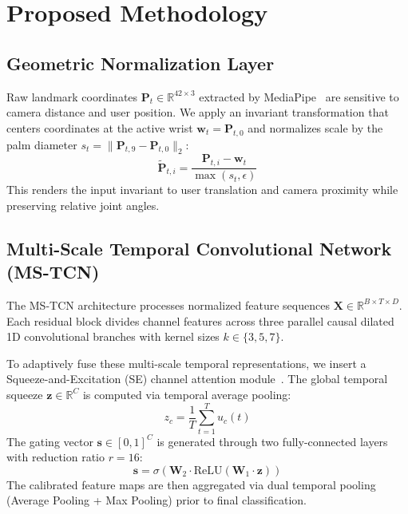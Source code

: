 \documentclass[journal,compsoc]{IEEEtran}
\begin{document}
\section{Proposed Methodology}

\subsection{Geometric Normalization Layer}
Raw landmark coordinates $\mathbf{P}_t \in \mathbb{R}^{42 \times 3}$ extracted by MediaPipe~\cite{lugaresi2019mediapipe} are sensitive to camera distance and user position. We apply an invariant transformation that centers coordinates at the active wrist $\mathbf{w}_t = \mathbf{P}_{t, 0}$ and normalizes scale by the palm diameter $s_t = \|\mathbf{P}_{t, 9} - \mathbf{P}_{t, 0}\|_2$:
\begin{equation}
\mathbf{\tilde{P}}_{t, i} = \frac{\mathbf{P}_{t, i} - \mathbf{w}_t}{\max(s_t, \epsilon)}
\label{eq:norm}
\end{equation}
This renders the input invariant to user translation and camera proximity while preserving relative joint angles.

\subsection{Multi-Scale Temporal Convolutional Network (MS-TCN)}
The MS-TCN architecture processes normalized feature sequences $\mathbf{X} \in \mathbb{R}^{B \times T \times D}$. Each residual block divides channel features across three parallel causal dilated 1D convolutional branches with kernel sizes $k \in \{3, 5, 7\}$.

To adaptively fuse these multi-scale temporal representations, we insert a Squeeze-and-Excitation (SE) channel attention module~\cite{hu2018squeeze}. The global temporal squeeze $\mathbf{z} \in \mathbb{R}^{C}$ is computed via temporal average pooling:
\begin{equation}
z_c = \frac{1}{T} \sum_{t=1}^T u_c(t)
\end{equation}
The gating vector $\mathbf{s} \in [0, 1]^C$ is generated through two fully-connected layers with reduction ratio $r=16$:
\begin{equation}
\mathbf{s} = \sigma\left(\mathbf{W}_2 \cdot \text{ReLU}(\mathbf{W}_1 \cdot \mathbf{z})\right)
\end{equation}
The calibrated feature maps are then aggregated via dual temporal pooling (Average Pooling + Max Pooling) prior to final classification.
\end{document}
